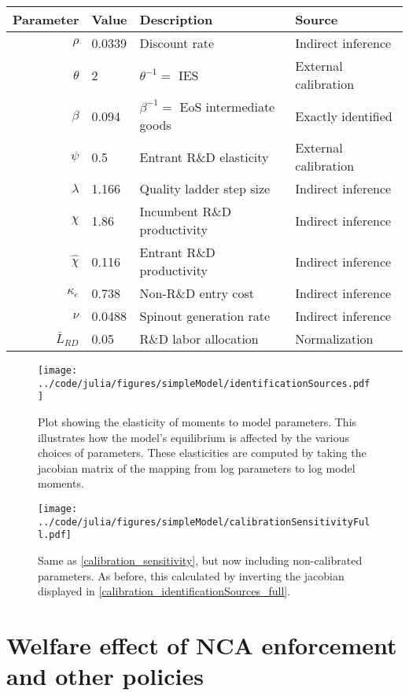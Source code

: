 \documentclass[11pt,english]{article}
\begin{document}
\begin{table}[]
	\centering
	\label{calibration_parameters}
	\begin{tabular}{rlll}
		\toprule \toprule
		Parameter & Value & Description & Source \tabularnewline
		\midrule
		$\rho$ & 0.0339 & Discount rate  & Indirect inference \tabularnewline
		$\theta$ & 2 & $\theta^{-1} = $ IES & External calibration 
		\tabularnewline
		$\beta$ & 0.094 & $\beta^{-1} = $ EoS intermediate goods & Exactly identified \tabularnewline 
		$\psi$ & 0.5 & Entrant R\&D elasticity & External calibration \tabularnewline
		$\lambda$ & 1.166 & Quality ladder step size & Indirect inference 
		\tabularnewline
		$\chi$ & 1.86 & Incumbent R\&D productivity & Indirect inference 
		\tabularnewline
		$\hat{\chi}$ & 0.116 & Entrant R\&D productivity & Indirect inference \tabularnewline 
		$\kappa_e$ & 0.738 & Non-R\&D entry cost & Indirect inference \tabularnewline
		$\nu$ & 0.0488 & Spinout generation rate  & Indirect inference\tabularnewline
		$\bar{L}_{RD}$ & 0.05 & R\&D labor allocation  & Normalization \tabularnewline
		\bottomrule
	\end{tabular}
\end{table}

\begin{figure}[]
	\texttt{[image: ../code/julia/figures/simpleModel/identificationSources.pdf]}
	\caption{Plot showing the elasticity of moments to model parameters. This illustrates how the model's equilibrium is affected by the various choices of parameters. These elasticities are computed by taking the jacobian matrix of the mapping from log parameters to log model moments.}
	\label{calibration_identificationSources}
\end{figure}

\begin{figure}[]
	\texttt{[image: ../code/julia/figures/simpleModel/calibrationSensitivityFull.pdf]}
	\caption{Same as \autoref{calibration_sensitivity}, but now including non-calibrated parameters. As before, this calculated by inverting the jacobian displayed in \autoref{calibration_identificationSources_full}.}
	\label{calibration_sensitivity_full}
\end{figure}

\section{Welfare effect of NCA enforcement and other policies}\label{sec:policy_analysis}
\end{document}
